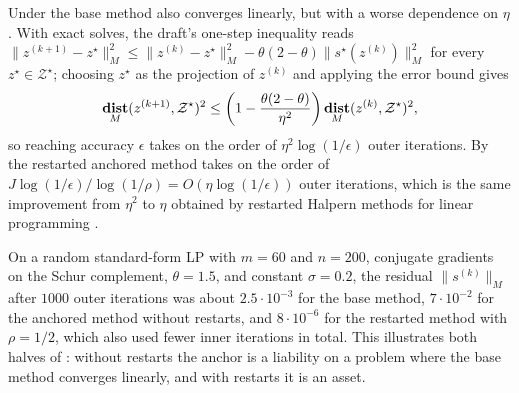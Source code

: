 \begin{remark}
    Under  the base method also converges linearly, but with a worse dependence on $\eta$.
    With exact solves, the draft's one-step inequality reads $\|z^{(k+1)} - z^\star\|_M^2 \le \|z^{(k)} - z^\star\|_M^2 - \theta(2-\theta)\|s^\star(z^{(k)})\|_M^2$ for every $z^\star \in \mathcal{Z}^\star$; choosing $z^\star$ as the projection of $z^{(k)}$ and applying the error bound gives
    \begin{align}
        \mathop{\bf dist{}}_M(z^{(k+1)}, \mathcal{Z}^\star)^2 \le \left(1 - \frac{\theta(2-\theta)}{\eta^2}\right)\mathop{\bf dist{}}_M(z^{(k)}, \mathcal{Z}^\star)^2 ,
    \end{align}
    so reaching accuracy $\epsilon$ takes on the order of $\eta^2\log(1/\epsilon)$ outer iterations.
    By  the restarted anchored method takes on the order of $J\log(1/\epsilon)/\log(1/\rho) = O(\eta\log(1/\epsilon))$ outer iterations, which is the same improvement from $\eta^2$ to $\eta$ obtained by restarted Halpern methods for linear programming \citep{lu2024restarted}.
\end{remark}

\begin{remark}
    On a random standard-form LP with $m = 60$ and $n = 200$, conjugate gradients on the Schur complement, $\theta = 1.5$, and constant $\sigma = 0.2$, the residual $\|s^{(k)}\|_M$ after $1000$ outer iterations was about $2.5\cdot 10^{-3}$ for the base method, $7\cdot 10^{-2}$ for the anchored method without restarts, and $8\cdot 10^{-6}$ for the restarted method with $\rho = 1/2$, which also used fewer inner iterations in total.
    This illustrates both halves of : without restarts the anchor is a liability on a problem where the base method converges linearly, and with restarts it is an asset.
\end{remark}


